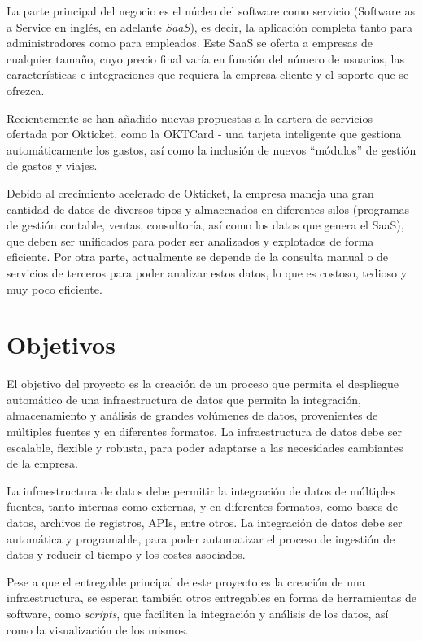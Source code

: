 La parte principal del negocio es el núcleo del software como servicio (Software
as a Service en inglés, en adelante \textit{SaaS}), es decir, la aplicación
completa tanto para administradores como para empleados. Este SaaS se oferta a
empresas de cualquier tamaño, cuyo precio final varía en función del número de
usuarios, las características e integraciones que requiera la empresa cliente y
el soporte que se ofrezca.

Recientemente se han añadido nuevas propuestas a la cartera de servicios
ofertada por Okticket, como la OKTCard {-} una tarjeta inteligente que gestiona
automáticamente los gastos, así como la inclusión de nuevos ``módulos'' de
gestión de gastos y viajes.

Debido al crecimiento acelerado de Okticket, la empresa maneja una gran cantidad
de datos de diversos tipos y almacenados en diferentes silos (programas de
gestión contable, ventas, consultoría, así como los datos que genera el SaaS),
que deben ser unificados para poder ser analizados y explotados de forma eficiente.
Por otra parte, actualmente se depende de la consulta manual o de servicios de
terceros para poder analizar estos datos, lo que es costoso, tedioso y muy
poco eficiente.

\section{Objetivos}\label{sec:objetivos}
El objetivo del proyecto es la creación de un proceso que permita el despliegue
automático de una infraestructura de datos que permita la integración,
almacenamiento y análisis de grandes volúmenes de datos, provenientes de
múltiples fuentes y en diferentes formatos. La infraestructura de datos debe ser
escalable, flexible y robusta, para poder adaptarse a las necesidades cambiantes
de la empresa.

La infraestructura de datos debe permitir la integración de datos de múltiples
fuentes, tanto internas como externas, y en diferentes formatos, como bases de
datos, archivos de registros, APIs, entre otros. La integración de datos debe
ser automática y programable, para poder automatizar el proceso de ingestión de
datos y reducir el tiempo y los costes asociados.

Pese a que el entregable principal de este proyecto es la creación de una
infraestructura, se esperan también otros entregables en forma de herramientas
de software, como \textit{scripts}, que faciliten la integración y análisis de
los datos, así como la visualización de los mismos.
